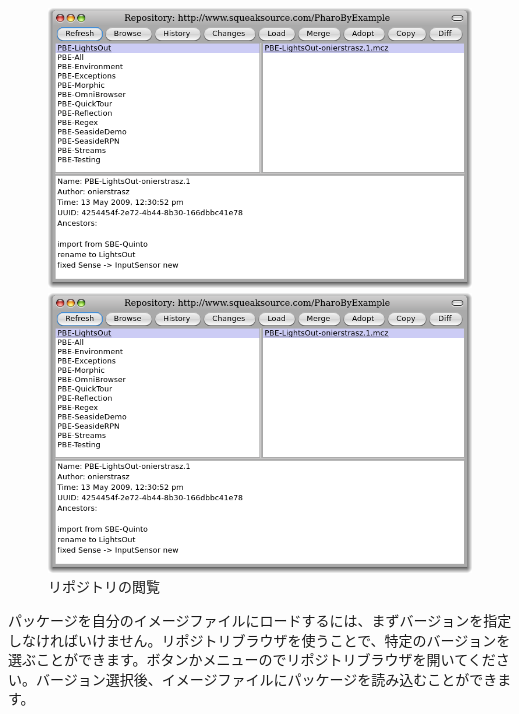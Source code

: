 \documentclass[a4paper,10pt,twoside]{book}
\begin{document}
\begin{figure}[hbt]
\ifluluelse
	{\centerline {\includegraphics[width=\textwidth]{BrowseRepository}}}
	{\centerline {\includegraphics[scale=0.7]{BrowseRepository}}}
\caption{リポジトリの閲覧
}
\end{figure}


パッケージを自分のイメージファイルにロードするには、まずバージョンを指定しなければいけません。リポジトリブラウザを使うことで、特定のバージョンを選ぶことができます。ボタンかメニューの\actclick でリポジトリブラウザを開いてください。バージョン選択後、イメージファイルにパッケージを読み込むことができます。

\end{document}
